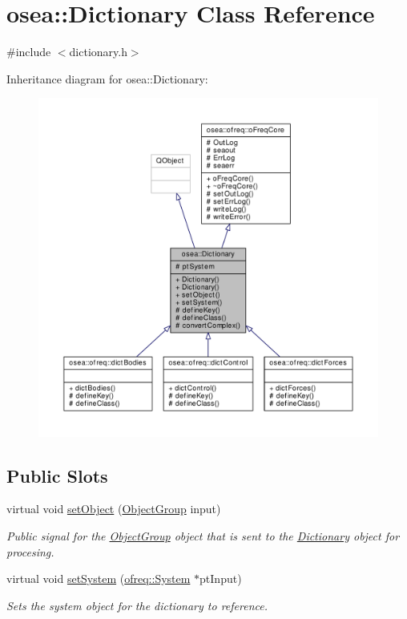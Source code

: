 \hypertarget{classosea_1_1_dictionary}{\section{osea\-:\-:Dictionary Class Reference}
\label{classosea_1_1_dictionary}
}


{\ttfamily \#include $<$dictionary.\-h$>$}



Inheritance diagram for osea\-:\-:Dictionary\-:
\nopagebreak
\begin{figure}[H]
\begin{center}
\leavevmode
\includegraphics[width=350pt]{classosea_1_1_dictionary__inherit__graph}
\end{center}
\end{figure}
\subsection*{Public Slots}
\begin{DoxyCompactItemize}
\item 
virtual void \hyperlink{classosea_1_1_dictionary_a900221a385d133644aedcadbae90c2be}{set\-Object} (\hyperlink{classosea_1_1_object_group}{Object\-Group} input)
\begin{DoxyCompactList}\small\item\em Public signal for the \hyperlink{classosea_1_1_object_group}{Object\-Group} object that is sent to the \hyperlink{classosea_1_1_dictionary}{Dictionary} object for procesing. \end{DoxyCompactList}\item 
virtual void \hyperlink{classosea_1_1_dictionary_a4f5b4ce990794a633ff8b69b8c021b66}{set\-System} (\hyperlink{classosea_1_1ofreq_1_1_system}{ofreq\-::\-System} $\ast$pt\-Input)
\begin{DoxyCompactList}\small\item\em Sets the system object for the dictionary to reference. \end{DoxyCompactList}\end{DoxyCompactItemize}
